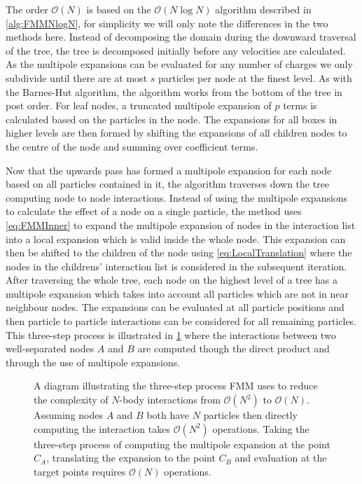 The order $\mathcal{O}(N)$ is based on the $\mathcal{O}(N\log N)$ algorithm described in \cref{alg:FMMNlogN}, for simplicity we will only note the differences in the two methods here. Instead of decomposing the domain during the downward traversal of the tree, the tree is decomposed initially before any velocities are calculated. As the multipole expansions can be evaluated for any number of charges we only subdivide until there are at most $s$ particles per node at the finest level. As with the Barnes-Hut algorithm, the algorithm works from the bottom of the tree in post order. For leaf nodes, a truncated multipole expansion of $p$ terms is calculated based on the particles in the node. The expansions for all boxes in higher levels are then formed by shifting the expansions of all children nodes to the centre of the node and summing over coefficient terms.

Now that the upwards pass has formed a multipole expansion for each node based on all particles contained in it, the algorithm traverses down the tree computing node to node interactions. Instead of using the multipole expansions to calculate the effect of a node on a single particle, the method uses \cref{eq:FMMInner} to expand the multipole expansion of nodes in the interaction list into a local expansion which is valid inside the whole node. This expansion can then be shifted to the children of the node using \cref{eq:LocalTranslation} where the nodes in the childrens' interaction list is considered in the subsequent iteration.  After traversing the whole tree, each node on the highest level of a tree has a multipole expansion which takes into account all particles which are not in near neighbour nodes. The expansions can  be evaluated at all particle positions and then particle to particle interactions can be considered for all remaining particles. This three-step process is illustrated in \cref{fig:3Step} where the interactions between two well-separated nodes $A$ and $B$ are computed though the direct product and through the use of multipole expansions.

\begin{figure}
    \centering
        \resizebox{.6\linewidth}{!}{}
    \caption[A diagram illustrating the three-step process FMM uses to reduce the complexity of $N$-body interactions from $\mathcal{O}(N^2)$ to $\mathcal{O}(N)$.]{A diagram illustrating the three-step process FMM uses to reduce the complexity of $N$-body interactions from $\mathcal{O}(N^2)$ to $\mathcal{O}(N)$. Assuming nodes $A$ and $B$ both have $N$ particles then directly computing the interaction takes $\mathcal{O}(N^2)$ operations. Taking the three-step process of computing the multipole expansion at the point $C_A$, translating the expansion to the point $C_B$ and evaluation at the target points requires $\mathcal{O}(N)$ operations.
    }
    \label{fig:3Step}
\end{figure}

